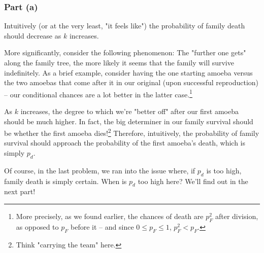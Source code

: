 \subsubsection{Part (a)}

Intuitively (or at the very least, "it feels like") the probability of family death should decrease as $k$ increases.

More significantly, consider the following phenomenon: The "further one gets" along the family tree, the more likely it seems that the family will survive indefinitely. As a brief example, consider having the one starting amoeba versus the two amoebas that come after it in our original (upon successful reproduction) -- our conditional chances are a lot better in the latter case.\footnote{More precisely, as we found earlier, the chances of death are $p_F^2$ after division, as opposed to $p_F$ before it -- and since $0 \leq p_F \leq 1$, $p_F^2 < p_F$.}

As $k$ increases, the degree to which we're "better off" after our first amoeba should be much higher. In fact, the big determiner in our family survival should be whether the first amoeba dies!\footnote{Think "carrying the team" here.} Therefore, intuitively, the probability of family survival should approach the probability of the first amoeba's death, which is simply $p_d$. 

Of course, in the last problem, we ran into the issue where, if $p_d$ is too high, family death is simply certain. When is $p_d$ too high here? We'll find out in the next part!





